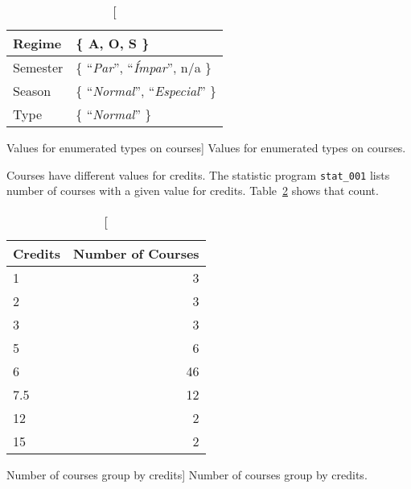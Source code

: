 \begin{table}[h!]
    \centering

    \begin{tabular}{| l | l |}
        \hline
        Regime   & \{ A, O, S \}                                    \\ \hline
        Semester & \{ ``\textit{Par}'', ``\textit{Ímpar}'', n/a \}  \\ \hline
        Season   & \{ ``\textit{Normal}'', ``\textit{Especial}'' \} \\ \hline
        Type     & \{ ``\textit{Normal}'' \}                        \\ \hline
    \end{tabular}

    \caption
        [Values for enumerated types on courses]
        {Values for enumerated types on courses.}

    \label{tab:courses_enum}
\end{table}

Courses have different values for credits. The statistic program
\texttt{stat\_001} lists number of courses with a given value for credits.
Table~\ref{tab:courses_credits} shows that count.

\begin{table}[h!]
    \centering

    \begin{tabular}{| l | r |}
        \hline
        Credits & Number of Courses \\ \hline
        1       & 3                 \\ \hline
        2       & 3                 \\ \hline
        3       & 3                 \\ \hline
        5       & 6                 \\ \hline
        6       & 46                \\ \hline
        7.5     & 12                \\ \hline
        12      & 2                 \\ \hline
        15      & 2                 \\ \hline
    \end{tabular}

    \caption
        [Number of courses group by credits]
        {Number of courses group by credits.}

    \label{tab:courses_credits}
\end{table}

